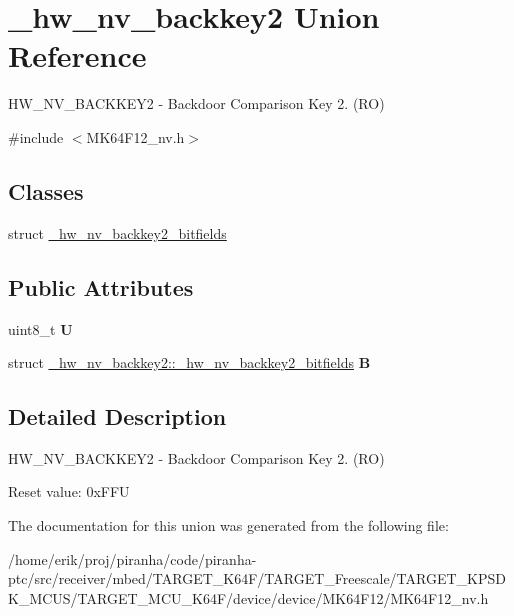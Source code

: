 \hypertarget{union__hw__nv__backkey2}{}\section{\+\_\+hw\+\_\+nv\+\_\+backkey2 Union Reference}
\label{union__hw__nv__backkey2}


H\+W\+\_\+\+N\+V\+\_\+\+B\+A\+C\+K\+K\+E\+Y2 -\/ Backdoor Comparison Key 2. (RO)  




{\ttfamily \#include $<$M\+K64\+F12\+\_\+nv.\+h$>$}

\subsection*{Classes}
\begin{DoxyCompactItemize}
\item 
struct \hyperlink{struct__hw__nv__backkey2_1_1__hw__nv__backkey2__bitfields}{\+\_\+hw\+\_\+nv\+\_\+backkey2\+\_\+bitfields}
\end{DoxyCompactItemize}
\subsection*{Public Attributes}
\begin{DoxyCompactItemize}
\item 
uint8\+\_\+t {\bfseries U}\hypertarget{union__hw__nv__backkey2_a621a4894e37076f7f1a979c3745fa2ba}{}\label{union__hw__nv__backkey2_a621a4894e37076f7f1a979c3745fa2ba}

\item 
struct \hyperlink{struct__hw__nv__backkey2_1_1__hw__nv__backkey2__bitfields}{\+\_\+hw\+\_\+nv\+\_\+backkey2\+::\+\_\+hw\+\_\+nv\+\_\+backkey2\+\_\+bitfields} {\bfseries B}\hypertarget{union__hw__nv__backkey2_acfaa5358680896556460e80d9179bd4e}{}\label{union__hw__nv__backkey2_acfaa5358680896556460e80d9179bd4e}

\end{DoxyCompactItemize}


\subsection{Detailed Description}
H\+W\+\_\+\+N\+V\+\_\+\+B\+A\+C\+K\+K\+E\+Y2 -\/ Backdoor Comparison Key 2. (RO) 

Reset value\+: 0x\+F\+FU 

The documentation for this union was generated from the following file\+:\begin{DoxyCompactItemize}
\item 
/home/erik/proj/piranha/code/piranha-\/ptc/src/receiver/mbed/\+T\+A\+R\+G\+E\+T\+\_\+\+K64\+F/\+T\+A\+R\+G\+E\+T\+\_\+\+Freescale/\+T\+A\+R\+G\+E\+T\+\_\+\+K\+P\+S\+D\+K\+\_\+\+M\+C\+U\+S/\+T\+A\+R\+G\+E\+T\+\_\+\+M\+C\+U\+\_\+\+K64\+F/device/device/\+M\+K64\+F12/M\+K64\+F12\+\_\+nv.\+h\end{DoxyCompactItemize}
